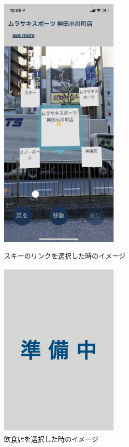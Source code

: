 \begin{figure}[h]
  \begin{minipage}{0.5\hsize}
    \centering
    \includegraphics[width=60mm]{images/ar_navigation_jibotyo_ski.png}
    \caption{スキーのリンクを選択した時のイメージ} \label{fig:ar_navigation_jibotyo_ski}
  \end{minipage}
  \begin{minipage}{0.5\hsize}
    \centering
    \includegraphics[width=60mm]{images/wip2.jpg}
    \caption{飲食店を選択した時のイメージ} \label{fig:ar_navigation_jibotyo_lunch}
  \end{minipage}
\end{figure}

